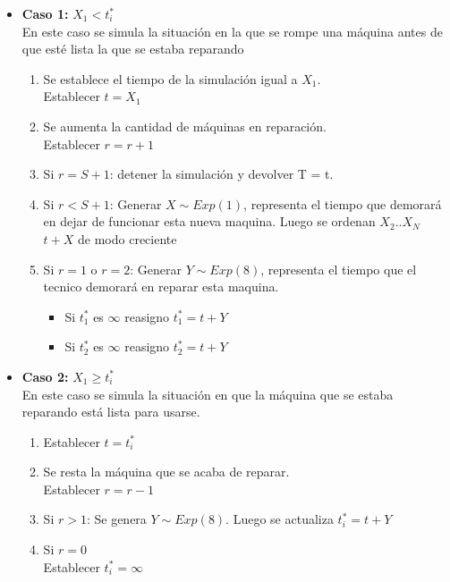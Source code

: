 \documentclass[11pt, spanish, a4paper]{article}
\begin{document}
\begin{itemize}
	\item \textbf{Caso 1: }$X_1 < t^*_i $\\
	En este caso se simula la situaci\'on en la que se rompe una m\'aquina antes de que est\'e lista la que se estaba reparando\\
	\begin{enumerate}
	\item Se establece el tiempo de la simulaci\'on igual a $X_1$.\\
	Establecer $t = X_1$
	\item Se aumenta la cantidad de m\'aquinas en reparaci\'on.\\
	Establecer $r = r+1$
	\item Si $ r = S+1$: detener la simulaci\'on y devolver T = t.\\
	\item Si $ r < S+1$: Generar $X \sim Exp(1)$, representa el tiempo que demorar\'a en dejar de funcionar esta nueva maquina. Luego se ordenan $X_2 .. X_N$ $t+X$ de modo creciente\\
	\item Si $ r = 1$ o $r = 2$: Generar $Y \sim Exp(8)$, representa el tiempo que el tecnico demorar\'a en reparar esta maquina.
	\begin{itemize}
	\item Si $t^*_1$ es $\infty$ reasigno $t^*_1 = t + Y$
	\item Si $t^*_2$ es $\infty$ reasigno $t^*_2 = t + Y$
\end{itemize}	
	\end{enumerate}
	\item \textbf{Caso 2: } $X_1 \geq t^*_i $\\
	
	En este caso se simula la situaci\'on en que la m\'aquina que se estaba reparando est\'a lista para usarse.
	\begin{enumerate}
	\item Establecer $t = t^*_i$
	\item Se resta la m\'aquina que se acaba de reparar.\\
	Establecer	$r = r-1$
	\item Si $ r > 1$: Se genera $Y \sim Exp(8)$. Luego se actualiza $t^*_i = t + Y$
	\item Si $r = 0$\\
	Establecer $t^*_i = \infty$
\end{enumerate}	
\end{itemize}
\end{document}
